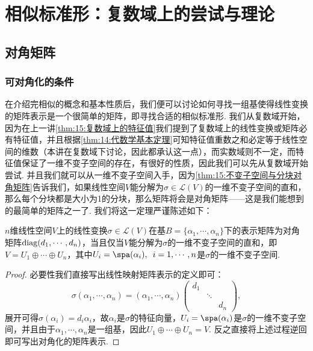 \chapter{相似标准形：复数域上的尝试与理论}

\section{对角矩阵}
\subsection{可对角化的条件}

在介绍完相似的概念和基本性质后，我们便可以讨论如何寻找一组基使得线性变换的矩阵表示是一个很简单的矩阵，即寻找合适的相似标准形. 我们从复数域开始，因为在上一讲\autoref{thm:15:复数域上的特征值}我们提到了复数域上的线性变换或矩阵必有特征值，并且根据\autoref{thm:14:代数学基本定理}可知特征值重数之和必定等于线性空间的维数（本讲在复数域下讨论，因此都承认这一点），而实数域则不一定，而特征值保证了一维不变子空间的存在，有很好的性质，因此我们可以先从复数域开始尝试. 并且我们就可以从一维不变子空间入手，因为\autoref{thm:15:不变子空间与分块对角矩阵}告诉我们，如果线性空间$V$能分解为$\sigma\in\mathcal{L}(V)$的一维不变子空间的直和，那么每个分块都是大小为1的分块，那么矩阵将会是对角矩阵——这是我们能想到的最简单的矩阵之一了. 我们将这一定理严谨陈述如下：
\begin{theorem} \label{thm:16:对角矩阵等价一维不变子空间}
    $n$维线性空间$V$上的线性变换$\sigma\in\mathcal{L}(V)$在基$B=\{\alpha_1,\cdots,\alpha_n\}$下的表示矩阵为对角矩阵$\operatorname{diag}(d_1,\cdots,d_n)$，当且仅当$V$能分解为$\sigma$的一维不变子空间的直和，即$V=U_1\oplus\cdots\oplus U_n$，其中$U_i=\spa(\alpha_i),\enspace i=1,\cdots,n$是$\sigma$的一维不变子空间.
\end{theorem}
\begin{proof}
    必要性我们直接写出线性映射矩阵表示的定义即可：
    \[\sigma(\alpha_1,\cdots,\alpha_n)=(\alpha_1,\cdots,\alpha_n)\begin{pmatrix}
            d_1 &        &        \\
                & \ddots &        \\
                &        & d_n
        \end{pmatrix},\]
    展开可得$\sigma(\alpha_i)=d_i\alpha_i$，故$\alpha_i$是$\sigma$的特征向量，$U_i=\spa(\alpha_i)$是$\sigma$的一维不变子空间，并且由于$\alpha_1,\cdots,\alpha_n$是一组基，因此$U_1\oplus\cdots\oplus U_n=V$. 反之直接将上述过程逆回即可写出对角化的矩阵表示.
\end{proof}

